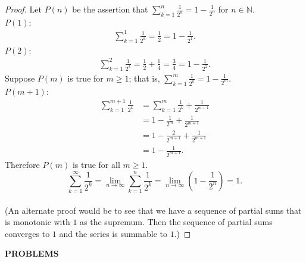 \begin{flushleft}
\begin{proof}
	Let $P(n)$ be the assertion that $\sum_{k=1}^n\frac{1}{2^k}=1-\frac{1}{2^n}$ for $n\in\mathbb{N}$.\\
	$P(1)$:
	\begin{align*}
		\sum_{k=1}^1\frac{1}{2^k}=\frac{1}{2}=1-\frac{1}{2^1}.
	\end{align*}
	$P(2)$:
	\begin{align*}
		\sum_{k=1}^2\frac{1}{2^k}=\frac{1}{2}+\frac{1}{4}=\frac{3}{4}=1-\frac{1}{2^2}.
	\end{align*}
	Suppose $P(m)$ is true for $m\ge1$; that is, $\sum_{k=1}^m\frac{1}{2^k}=1-\frac{1}{2^m}$.\\
	$P(m+1)$:
	\begin{align*}
		\sum_{k=1}^{m+1}\frac{1}{2^k}&=\sum_{k=1}^m\frac{1}{2^k}+\frac{1}{2^{m+1}}\\
		&=1-\frac{1}{2^m}+\frac{1}{2^{m+1}}\\
		&=1-\frac{2}{2^{m+1}}+\frac{1}{2^{m+1}}\\
		&=1-\frac{1}{2^{m+1}}.
	\end{align*}
	Therefore $P(m)$ is true for all $m\ge1$.
	\[
		\sum_{k=1}^\infty\frac{1}{2^k}=\lim_{n\to\infty}\sum_{k=1}^n\frac{1}{2^k}=\lim_{n\to\infty}(1-\frac{1}{2^n})=1.
	\]
	\\(An alternate proof would be to see that we have a sequence of partial sums that is monotonic with $1$ as the supremum. Then the sequence of partial sums converges to $1$ and the series is summable to $1$.)
\end{proof}

\end{flushleft}
\begin{center}
	\textbf{PROBLEMS}
\end{center}
